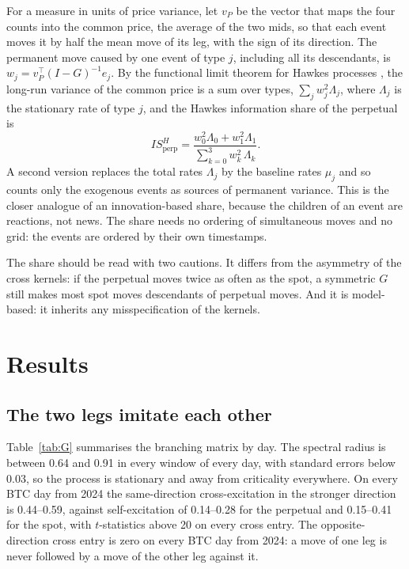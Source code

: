 \documentclass[a4paper,11pt]{article}
\begin{document}
For a measure in units of price variance, let $v_P$ be the vector that maps the four counts into the common price, the average of the two mids, so that each event moves it by half the mean move of its leg, with the sign of its direction. The permanent move caused by one event of type $j$, including all its descendants, is $w_j = v_P^\top (I - G)^{-1} e_j$. By the functional limit theorem for Hawkes processes \cite{bacry2013limit}, the long-run variance of the common price is a sum over types, $\sum_j w_j^2 \Lambda_j$, where $\Lambda_j$ is the stationary rate of type $j$, and the Hawkes information share of the perpetual is
\begin{equation}\label{eq:is}
IS^{H}_{\text{perp}} = \frac{w_0^2 \Lambda_0 + w_1^2 \Lambda_1}{\sum_{k=0}^{3} w_k^2\, \Lambda_k}.
\end{equation}
A second version replaces the total rates $\Lambda_j$ by the baseline rates $\mu_j$ and so counts only the exogenous events as sources of permanent variance. This is the closer analogue of an innovation-based share, because the children of an event are reactions, not news. The share needs no ordering of simultaneous moves and no grid: the events are ordered by their own timestamps.

The share should be read with two cautions. It differs from the asymmetry of the cross kernels: if the perpetual moves twice as often as the spot, a symmetric $G$ still makes most spot moves descendants of perpetual moves. And it is model-based: it inherits any misspecification of the kernels.

\section{Results}

\subsection{The two legs imitate each other}

Table~\ref{tab:G} summarises the branching matrix by day. The spectral radius is between 0.64 and 0.91 in every window of every day, with standard errors below 0.03, so the process is stationary and away from criticality everywhere. On every BTC day from 2024 the same-direction cross-excitation in the stronger direction is 0.44--0.59, against self-excitation of 0.14--0.28 for the perpetual and 0.15--0.41 for the spot, with $t$-statistics above 20 on every cross entry. The opposite-direction cross entry is zero on every BTC day from 2024: a move of one leg is never followed by a move of the other leg against it.
\end{document}

